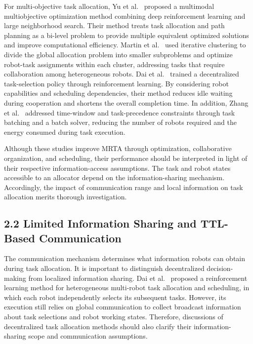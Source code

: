 \documentclass[type=submission,name=IR]{oae}
\begin{document}
For multi-objective task allocation, Yu et al.~\cite{yu_mmoeadl} proposed a multimodal multiobjective optimization method combining deep reinforcement learning and large neighborhood search. Their method treats task allocation and path planning as a bi-level problem to provide multiple equivalent optimized solutions and improve computational efficiency. Martin et al.~\cite{martin_iterative_clustering} used iterative clustering to divide the global allocation problem into smaller subproblems and optimize robot-task assignments within each cluster, addressing tasks that require collaboration among heterogeneous robots. Dai et al.~\cite{dai_heterogeneous_rl} trained a decentralized task-selection policy through reinforcement learning. By considering robot capabilities and scheduling dependencies, their method reduces idle waiting during cooperation and shortens the overall completion time. In addition, Zhang et al.~\cite{zhang_energy_efficient} addressed time-window and task-precedence constraints through task batching and a batch solver, reducing the number of robots required and the energy consumed during task execution.

Although these studies improve MRTA through optimization, collaborative organization, and scheduling, their performance should be interpreted in light of their respective information-access assumptions. The task and robot states accessible to an allocator depend on the information-sharing mechanism. Accordingly, the impact of communication range and local information on task allocation merits thorough investigation.

\subsection{2.2 Limited Information Sharing and TTL-Based Communication}
The communication mechanism determines what information robots can obtain during task allocation. It is important to distinguish decentralized decision-making from localized information sharing. Dai et al.~\cite{dai_heterogeneous_rl} proposed a reinforcement learning method for heterogeneous multi-robot task allocation and scheduling, in which each robot independently selects its subsequent tasks. However, its execution still relies on global communication to collect broadcast information about task selections and robot working states. Therefore, discussions of decentralized task allocation methods should also clarify their information-sharing scope and communication assumptions.
\end{document}
